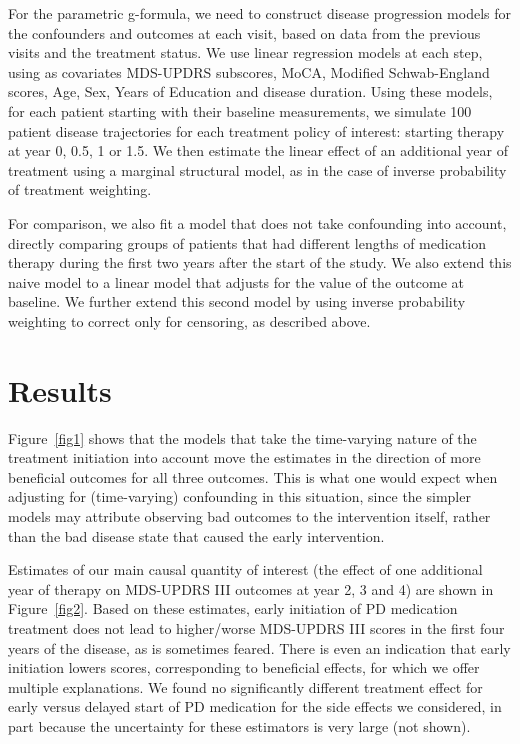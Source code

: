 \documentclass[final]{article}
\begin{document}
For the parametric g-formula, we need to construct disease progression models for the confounders and outcomes at each visit, based on data from the previous visits and the treatment status. We use linear regression models at each step, using as covariates MDS-UPDRS subscores, MoCA, Modified Schwab-England scores, Age, Sex, Years of Education and disease duration. Using these models, for each patient starting with their baseline measurements, we simulate 100 patient disease trajectories for each treatment policy of interest: starting therapy at year 0, 0.5, 1 or 1.5. We then estimate the linear effect of an additional year of treatment using a marginal structural model, as in the case of inverse probability of treatment weighting.

For comparison, we also fit a model that does not take confounding into account, directly comparing groups of patients that had different lengths of medication therapy during the first two years after the start of the study. We also extend this naive model to a linear model that adjusts for the value of the outcome at baseline. We further extend this second model by using inverse probability weighting to correct only for censoring, as described above.

\section*{Results}
Figure~\ref{fig1} shows that the models that take the time-varying nature of the treatment initiation into account move the estimates in the direction of more beneficial outcomes for all three outcomes. This is what one would expect when adjusting for (time-varying) confounding in this situation, since the simpler models may attribute observing bad outcomes to the intervention itself, rather than the bad disease state that caused the early intervention.

Estimates of our main causal quantity of interest (the effect of one additional year of therapy on MDS-UPDRS III outcomes at year 2, 3 and 4) are shown in Figure~\ref{fig2}. Based on these estimates, early initiation of PD medication treatment does not lead to higher/worse MDS-UPDRS III scores in the first four years of the disease, as is sometimes feared. There is even an indication that early initiation lowers scores, corresponding to beneficial effects, for which we offer multiple explanations. We found no significantly different treatment effect for early versus delayed start of PD medication for the side effects we considered, in part because the uncertainty for these estimators is very large (not shown). 
\end{document}
